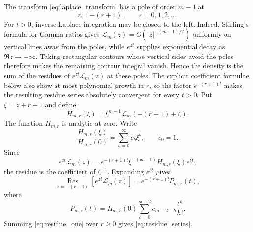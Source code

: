 \documentclass[11pt]{article}
\theoremstyle{remark}
\begin{document}
The transform \eqref{eq:laplace_transform} has a pole of order $m-1$ at
\[
 z=-(r+1),\qquad r=0,1,2,\ldots.
\]
For $t>0$, inverse Laplace integration may be closed to the left. Indeed, Stirling's formula for Gamma ratios gives $\mathcal L_m(z)=O(|z|^{-(m-1)/2})$ uniformly on vertical lines away from the poles, while $e^{zt}$ supplies exponential decay as $\Re z\to-\infty$. Taking rectangular contours whose vertical sides avoid the poles therefore makes the remaining contour integral vanish. Hence the density is the sum of the residues of $e^{zt}\mathcal L_m(z)$ at these poles. The explicit coefficient formulae below also show at most polynomial growth in $r$, so the factor $e^{-(r+1)t}$ makes the resulting residue series absolutely convergent for every $t>0$. Put $\xi=z+r+1$ and define
\begin{equation}
 H_{m,r}(\xi)=\xi^{m-1}\mathcal L_m(-(r+1)+\xi).
 \label{eq:H_def}
\end{equation}
The function $H_{m,r}$ is analytic at zero. Write
\begin{equation}
 \frac{H_{m,r}(\xi)}{H_{m,r}(0)}
 =\sum_{b=0}^{\infty}c_b\xi^b,
 \qquad c_0=1.
 \label{eq:c_series}
\end{equation}
Since
\[
 e^{zt}\mathcal L_m(z)
 =e^{-(r+1)t}\xi^{-(m-1)}H_{m,r}(\xi)e^{\xi t},
\]
the residue is the coefficient of $\xi^{-1}$. Expanding $e^{\xi t}$ gives
\begin{equation}
 \operatorname*{Res}_{z=-(r+1)}
 [e^{zt}\mathcal L_m(z)]
 =e^{-(r+1)t}P_{m,r}(t),
 \label{eq:residue_one}
\end{equation}
where
\begin{equation}
 P_{m,r}(t)=H_{m,r}(0)
 \sum_{h=0}^{m-2}c_{m-2-h}\frac{t^h}{h!}.
 \label{eq:Ppoly}
\end{equation}
Summing \eqref{eq:residue_one} over $r\ge0$ gives \eqref{eq:residue_series}.
\end{document}
